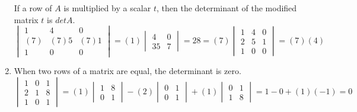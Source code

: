 \documentclass[../main.tex]{subfiles}
\begin{document}
\begin{example}
\begin{enumerate}
    If a row of \(A\) is multiplied by a scalar \(t\), then the determinant of the modified matrix \(t\) is \(det A\).
    \begin{equation*}
      \begin{vmatrix}
        1 & 4 & 0\\
        (7) & (7)5 & (7)1\\
        1 & 0 & 0
      \end{vmatrix}
      =(1)
      \begin{vmatrix}
        4 & 0\\
        35 & 7
      \end{vmatrix}
      =28 = (7)
      \begin{vmatrix}
        1 & 4 & 0\\
        2 & 5 & 1\\
        1 & 0 & 0
      \end{vmatrix}
      =(7)(4)
    \end{equation*}
    \item When two rows of a matrix are equal, the determinant is zero.
    \begin{equation*}
      \begin{vmatrix}
        1 & 0 & 1\\
        2 & 1 & 8\\
        1 & 0 & 1
      \end{vmatrix}
      =(1)
      \begin{vmatrix}
        1 & 8\\
        0 & 1
      \end{vmatrix}
      -(2)
      \begin{vmatrix}
        0 & 1\\
        0 & 1
      \end{vmatrix}
      +(1)
      \begin{vmatrix}
        0 & 1\\
        1 & 8
      \end{vmatrix}
      =1-0+(1)(-1) = 0
    \end{equation*}
    

\end{enumerate}
\end{example}
\end{document}

